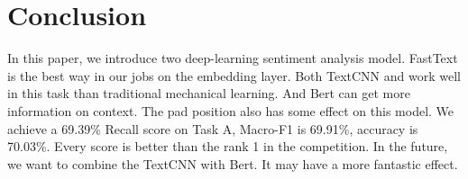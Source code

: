 \section{Conclusion}
In this paper, we introduce two deep-learning sentiment analysis model. FastText is the best way in our jobs on the embedding layer. Both TextCNN and work well in this task than traditional mechanical learning. And Bert can get more information on context. The pad position also has some effect on this model. We achieve a 69.39\% Recall score on Task A,  Macro-F1 is 69.91\%, accuracy is 70.03\%. Every score is better than the rank 1 in the competition. In the future, we want to combine the TextCNN with Bert. It may have a more fantastic effect.
